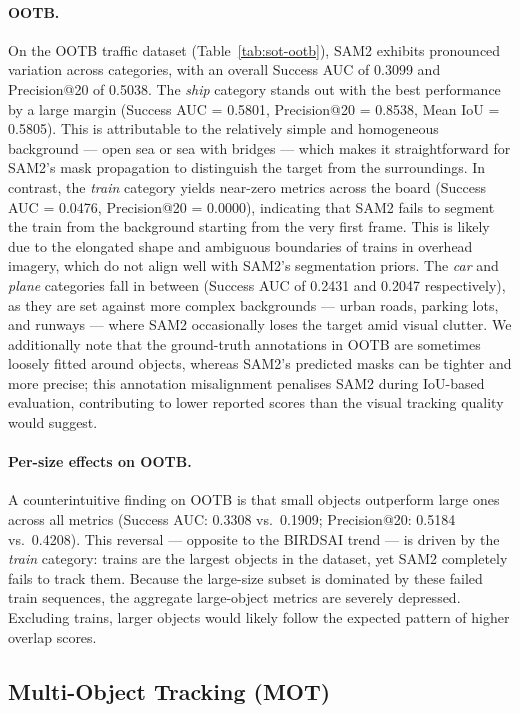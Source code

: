 \documentclass[
]{article}
\begin{document}
\paragraph{OOTB.}
On the OOTB traffic dataset (Table~\ref{tab:sot-ootb}), SAM2 exhibits pronounced variation across categories, with an overall Success AUC of 0.3099 and Precision@20 of 0.5038. The \textit{ship} category stands out with the best performance by a large margin (Success AUC = 0.5801, Precision@20 = 0.8538, Mean IoU = 0.5805). This is attributable to the relatively simple and homogeneous background — open sea or sea with bridges — which makes it straightforward for SAM2's mask propagation to distinguish the target from the surroundings. In contrast, the \textit{train} category yields near-zero metrics across the board (Success AUC = 0.0476, Precision@20 = 0.0000), indicating that SAM2 fails to segment the train from the background starting from the very first frame. This is likely due to the elongated shape and ambiguous boundaries of trains in overhead imagery, which do not align well with SAM2's segmentation priors. The \textit{car} and \textit{plane} categories fall in between (Success AUC of 0.2431 and 0.2047 respectively), as they are set against more complex backgrounds — urban roads, parking lots, and runways — where SAM2 occasionally loses the target amid visual clutter. We additionally note that the ground-truth annotations in OOTB are sometimes loosely fitted around objects, whereas SAM2's predicted masks can be tighter and more precise; this annotation misalignment penalises SAM2 during IoU-based evaluation, contributing to lower reported scores than the visual tracking quality would suggest.

\paragraph{Per-size effects on OOTB.}
A counterintuitive finding on OOTB is that small objects outperform large ones across all metrics (Success AUC: 0.3308 vs.\ 0.1909; Precision@20: 0.5184 vs.\ 0.4208). This reversal — opposite to the BIRDSAI trend — is driven by the \textit{train} category: trains are the largest objects in the dataset, yet SAM2 completely fails to track them. Because the large-size subset is dominated by these failed train sequences, the aggregate large-object metrics are severely depressed. Excluding trains, larger objects would likely follow the expected pattern of higher overlap scores.

\hypertarget{Multi-Object Tracking (MOT)}{%
\subsection{Multi-Object Tracking (MOT)}\label{MOT}}
\end{document}
